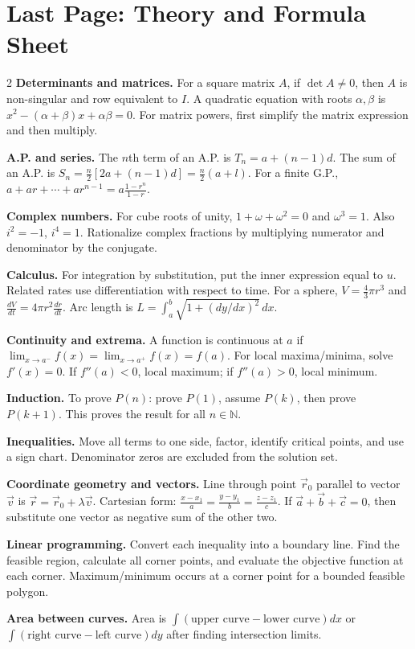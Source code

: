 \documentclass[11pt,a4paper]{article}
\begin{document}
\section*{Last Page: Theory and Formula Sheet}
\small
\begin{multicols}{2}
\textbf{Determinants and matrices.}
For a square matrix $A$, if $\det A\ne0$, then $A$ is non-singular and row equivalent to $I$. A quadratic equation with roots $\alpha,\beta$ is $x^2-(\alpha+\beta)x+\alpha\beta=0$. For matrix powers, first simplify the matrix expression and then multiply.

\textbf{A.P. and series.}
The $n$th term of an A.P. is $T_n=a+(n-1)d$. The sum of an A.P. is $S_n=\frac n2[2a+(n-1)d]=\frac n2(a+l)$. For a finite G.P., $a+ar+\cdots+ar^{n-1}=a\frac{1-r^n}{1-r}$.

\textbf{Complex numbers.}
For cube roots of unity, $1+\omega+\omega^2=0$ and $\omega^3=1$. Also $i^2=-1$, $i^4=1$. Rationalize complex fractions by multiplying numerator and denominator by the conjugate.

\textbf{Calculus.}
For integration by substitution, put the inner expression equal to $u$. Related rates use differentiation with respect to time. For a sphere, $V=\frac43\pi r^3$ and $\frac{dV}{dt}=4\pi r^2\frac{dr}{dt}$. Arc length is $L=\int_a^b\sqrt{1+(dy/dx)^2}\,dx$.

\textbf{Continuity and extrema.}
A function is continuous at $a$ if $\lim_{x\to a^-}f(x)=\lim_{x\to a^+}f(x)=f(a)$. For local maxima/minima, solve $f'(x)=0$. If $f''(a)<0$, local maximum; if $f''(a)>0$, local minimum.

\textbf{Induction.}
To prove $P(n)$: prove $P(1)$, assume $P(k)$, then prove $P(k+1)$. This proves the result for all $n\in\mathbb N$.

\textbf{Inequalities.}
Move all terms to one side, factor, identify critical points, and use a sign chart. Denominator zeros are excluded from the solution set.

\textbf{Coordinate geometry and vectors.}
Line through point $\vec r_0$ parallel to vector $\vec v$ is $\vec r=\vec r_0+\lambda\vec v$. Cartesian form: $\frac{x-x_1}{a}=\frac{y-y_1}{b}=\frac{z-z_1}{c}$. If $\vec a+\vec b+\vec c=0$, then substitute one vector as negative sum of the other two.

\textbf{Linear programming.}
Convert each inequality into a boundary line. Find the feasible region, calculate all corner points, and evaluate the objective function at each corner. Maximum/minimum occurs at a corner point for a bounded feasible polygon.

\textbf{Area between curves.}
Area is $\int(\text{upper curve}-\text{lower curve})dx$ or $\int(\text{right curve}-\text{left curve})dy$ after finding intersection limits.
\end{multicols}
\end{document}
